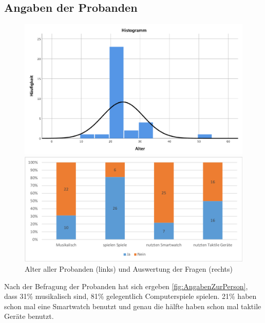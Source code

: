 
\subsection{Angaben der Probanden}

\begin{figure}[htbp] 
	\centering
	\begin{minipage}[t]{0.8\textwidth}
		\includegraphics[width=\textwidth]{pics/analyse/person/alter.png}
	\end{minipage}
	\begin{minipage}[t]{0.8\textwidth}
		\includegraphics[width=\textwidth]{pics/analyse/person/questions.png}
	\end{minipage}
	\caption{Alter aller Probanden (links) und Auswertung der Fragen (rechts)}
	\label{fig:AngabenZurPerson}
\end{figure}

Nach der Befragung der Probanden hat sich ergeben \autoref{fig:AngabenZurPerson}, dass 31\% musikalisch sind, 81\% gelegentlich Computerspiele spielen. 21\% haben schon mal eine Smartwatch benutzt und genau die h{\"a}lfte haben schon mal taktile Ger{\"a}te benutzt.

